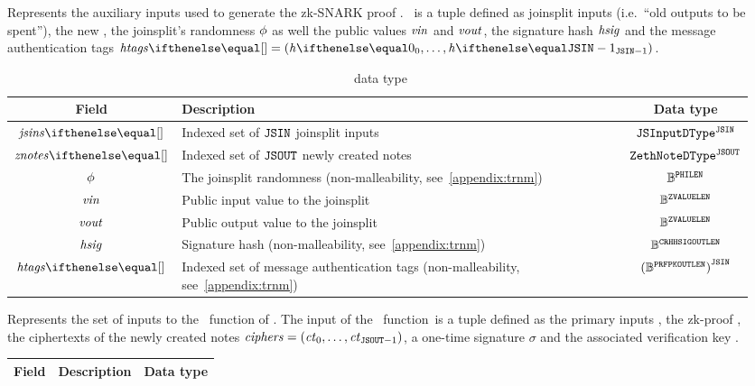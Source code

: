 \begin{description}
    \item[\auxInputDType] Represents the auxiliary inputs used to generate the zk-SNARK proof \zkp. \auxinputs~is a tuple defined as \gls{joinsplit} inputs (i.e.~``old outputs to be spent''), the new \zethnotes{}, the joinsplit's randomness $\mathit{\phi}$ as well the public values $\mathit{vin}$ and $\mathit{vout}$, the signature hash $\mathit{hsig}$ and the message authentication tags $\htags{} = \smalltuple{\htag{0}, \ldots, \htag{\jsin-1}}$.
        \begin{table}[H]
        \centering
        \begin{tabular}{cp{20em}c}
            Field & Description & Data type\\ \toprule
            $\jsins{}$ & Indexed set of $\mathtt{JSIN}$ \gls{joinsplit} inputs & ${\mathtt{JSInputDType}}^{\mathtt{JSIN}}$\\ \midrule
            $\znotes{}$ & Indexed set of $\mathtt{JSOUT}$ newly created notes & ${\mathtt{ZethNoteDType}}^{\mathtt{JSOUT}}$\\ \midrule
            $\mathit{\phi}$ & The \gls{joinsplit} randomness (non-malleability, see~\cref{appendix:trnm}) & $\mathbb{B}^{\mathtt{PHILEN}}$\\ \midrule
            $\mathit{vin}$ & Public input value to the \gls{joinsplit} & $\mathbb{B}^{\mathtt{ZVALUELEN}}$\\ \midrule
            $\mathit{vout}$ & Public output value to the \gls{joinsplit} & $\mathbb{B}^{\mathtt{ZVALUELEN}}$\\ \midrule
            $\mathit{hsig}$ & Signature hash (non-malleability, see~\cref{appendix:trnm}) & $\mathbb{B}^{\mathtt{CRHHSIGOUTLEN}}$\\ \midrule
            $\htags{}$ & Indexed set of message authentication tags (non-malleability, see~\cref{appendix:trnm}) & ${(\mathbb{B}^{\mathtt{PRFPKOUTLEN}})}^{\mathtt{JSIN}}$\\ \bottomrule
        \end{tabular}
        \caption{\auxInputDType~data type}\label{zeth-protocol:tab:auxinputs}
        \end{table}
    \item[\mixInputDType] Represents the set of inputs to the \mix~function of \mixer. The input of the \mix~function~is a tuple defined as the primary inputs \priminputs, the zk-proof \zkp, the ciphertexts of the newly created notes $\mathit{ciphers} = ({\mathit{ct}_{0}, \ldots, \mathit{ct}_{\mathtt{JSOUT} - 1}})$, a one-time signature $\sigma$ and the associated verification key \vk.
        \begin{table}[H]
        \centering
        \begin{tabular}{cp{20em}c}
            Field & Description & Data type\\ \toprule

\end{tabular}
\end{table}
\end{description}
